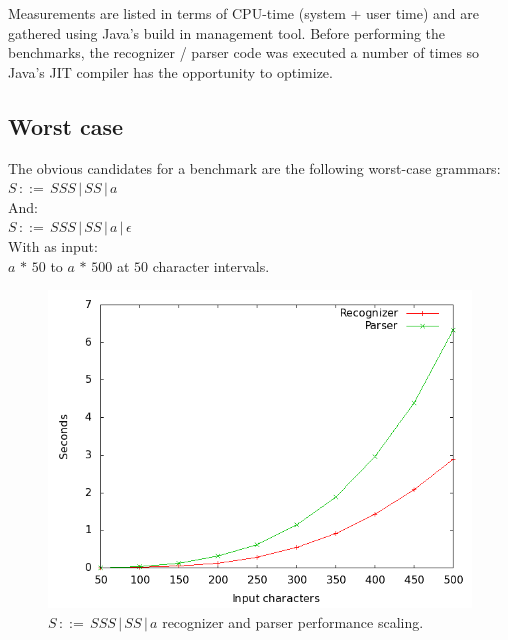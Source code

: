 \documentclass[a4paper,10pt]{article}
\begin{document}
Measurements are listed in terms of CPU-time (system + user time) and are gathered using Java's build in management tool. Before performing the benchmarks, the recognizer / parser code was executed a number of times so Java's JIT compiler has the opportunity to optimize.

\subsection{Worst case}
\label{sec:worstcaseBench}

The obvious candidates for a benchmark are the following worst-case grammars:
$S\,::=\,SSS\,|\,SS\,|\,a$\\
And:\\
$S\,::=\,SSS\,|\,SS\,|\,a\,|\,\epsilon$\\
With as input:\\
$a\,*\,50$ to $a\,*\,500$ at $50$ character intervals.

\begin{figure}[H]
\centering
\includegraphics[scale=0.4]{worst-case.png}
\caption{$S\,::=\,SSS\,|\,SS\,|\,a$ recognizer and parser performance scaling.}
\end{figure}
\end{document}
